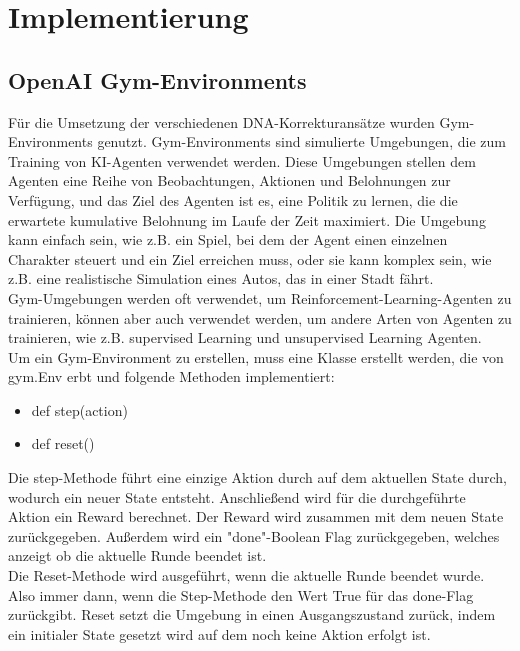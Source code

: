 \documentclass[oneside,bibliography=totocnumbered,BCOR=5mm]{scrbook}%
\theoremstyle{definition}
\theoremstyle{definition}
\theoremstyle{definition}
\theoremstyle{definition}
\theoremstyle{definition}
\theoremstyle{definition}
\begin{document}
\chapter{Implementierung}

\section{OpenAI Gym-Environments}

Für die Umsetzung der verschiedenen DNA-Korrekturansätze wurden Gym-Environments genutzt.
Gym-Environments sind simulierte Umgebungen, die zum Training von KI-Agenten verwendet werden. 
Diese Umgebungen stellen dem Agenten eine Reihe von Beobachtungen, Aktionen und Belohnungen zur Verfügung, 
und das Ziel des Agenten ist es, eine Politik zu lernen, 
die die erwartete kumulative Belohnung im Laufe der Zeit maximiert. 
Die Umgebung kann einfach sein, wie z.B. ein Spiel, bei dem der Agent einen einzelnen Charakter steuert und 
ein Ziel erreichen muss, oder sie kann komplex sein, wie z.B. eine realistische Simulation eines Autos, 
das in einer Stadt fährt. \\

Gym-Umgebungen werden oft verwendet, um Reinforcement-Learning-Agenten zu trainieren, 
können aber auch verwendet werden, um andere Arten von Agenten zu trainieren, 
wie z.B. supervised Learning und unsupervised Learning Agenten.\\

Um ein Gym-Environment zu erstellen, muss eine Klasse erstellt werden, 
die von gym.Env erbt und folgende Methoden implementiert:\\

\begin{itemize}
  \item def step(action)
  \item def reset()
\end{itemize}

Die step-Methode führt eine einzige Aktion durch auf dem aktuellen State durch, wodurch ein neuer State entsteht.
Anschließend wird für die durchgeführte Aktion ein Reward berechnet. Der Reward wird zusammen mit dem neuen State zurückgegeben. 
Außerdem wird ein "done"-Boolean Flag zurückgegeben, welches anzeigt ob die aktuelle Runde beendet ist. \\

Die Reset-Methode wird ausgeführt, wenn die aktuelle Runde beendet wurde. 
Also immer dann, wenn die Step-Methode den Wert True für das done-Flag zurückgibt. 
Reset setzt die Umgebung in einen Ausgangszustand zurück, indem ein initialer State gesetzt wird auf dem noch keine Aktion erfolgt ist. \\
\end{document}
